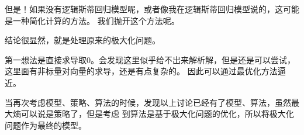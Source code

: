 \documentclass{article}
\begin{document}
        但是！如果没有逻辑斯蒂回归模型呢，或者像我在逻辑斯蒂回归模型说的，这可能是一种简化计算的方法。
        我们抛开这个方法呢。

        结论很显然，就是处理原来的极大化问题。

        第一想法是直接求导取0。会发现这里似乎给不出来解析解，但是还是可以尝试，这里面有非标量对向量的求导，还是有点复杂的。
        因此可以通过最优化方法逼近。

        当再次考虑模型、策略、算法的时候，发现以上讨论已经有了模型、算法，虽然最大熵可以说是策略了，但是考虑
        到算法是基于极大化问题的优化，所以将极大化问题作为最终的模型。

       
\end{document}
